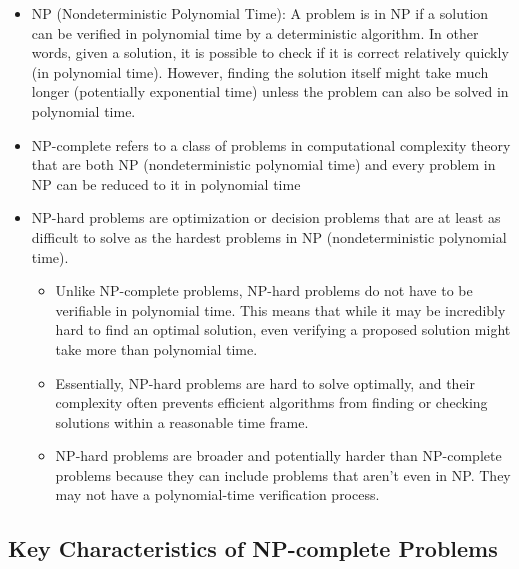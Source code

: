 \documentclass[
  letterpaper,
  DIV=11,
  numbers=noendperiod]{scrreprt}
\providecommand{\tightlist}{%
  \setlength{\itemsep}{0pt}\setlength{\parskip}{0pt}}\usepackage{longtable,booktabs,array}
\begin{document}
\begin{itemize}
\tightlist
\item
  NP (Nondeterministic Polynomial Time): A problem is in NP if a
  solution can be verified in polynomial time by a deterministic
  algorithm. In other words, given a solution, it is possible to check
  if it is correct relatively quickly (in polynomial time). However,
  finding the solution itself might take much longer (potentially
  exponential time) unless the problem can also be solved in polynomial
  time.
\item
  NP-complete refers to a class of problems in computational complexity
  theory that are both NP (nondeterministic polynomial time) and every
  problem in NP can be reduced to it in polynomial time
\item
  NP-hard problems are optimization or decision problems that are at
  least as difficult to solve as the hardest problems in NP
  (nondeterministic polynomial time).

  \begin{itemize}
  \tightlist
  \item
    Unlike NP-complete problems, NP-hard problems do not have to be
    verifiable in polynomial time. This means that while it may be
    incredibly hard to find an optimal solution, even verifying a
    proposed solution might take more than polynomial time.
  \item
    Essentially, NP-hard problems are hard to solve optimally, and their
    complexity often prevents efficient algorithms from finding or
    checking solutions within a reasonable time frame.
  \item
    NP-hard problems are broader and potentially harder than NP-complete
    problems because they can include problems that aren't even in NP.
    They may not have a polynomial-time verification process.
  \end{itemize}
\end{itemize}

\subsection{Key Characteristics of NP-complete
Problems}\label{key-characteristics-of-np-complete-problems}
\end{document}
